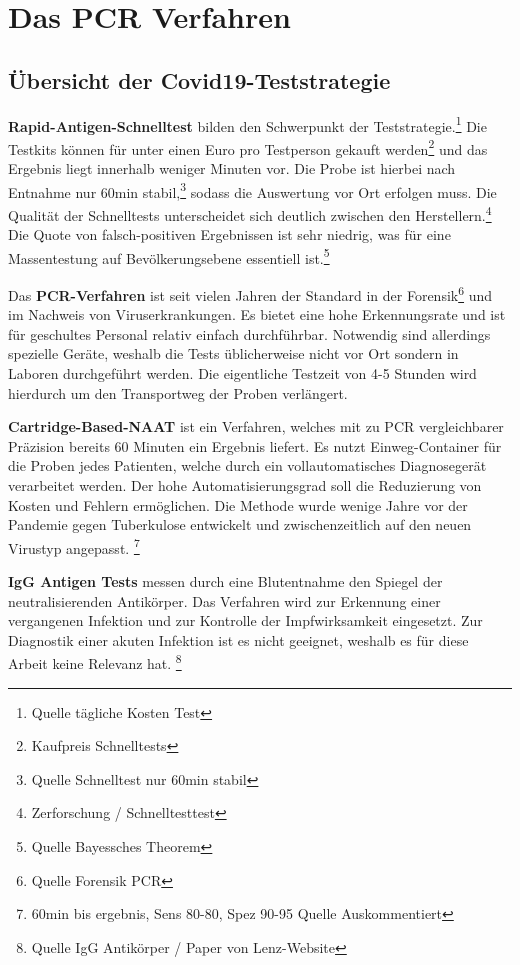 \chapter{Das PCR Verfahren}
\section{Übersicht der Covid19-Teststrategie}
\textbf{Rapid-Antigen-Schnelltest} bilden den Schwerpunkt der Teststrategie.\footnote{Quelle tägliche Kosten Test}
Die Testkits können für unter einen Euro pro Testperson gekauft werden\footnote{Kaufpreis Schnelltests}
und das Ergebnis liegt innerhalb weniger Minuten vor.
Die Probe ist hierbei nach Entnahme nur 60min stabil,\footnote{Quelle Schnelltest nur 60min stabil}
sodass die Auswertung vor Ort erfolgen muss.
Die Qualität der Schnelltests unterscheidet sich deutlich zwischen den Herstellern.\footnote{Zerforschung / Schnelltesttest}
Die Quote von falsch-positiven Ergebnissen ist sehr niedrig, was für eine Massentestung auf Bevölkerungsebene essentiell ist.\footnote{Quelle Bayessches Theorem}

Das \textbf{PCR-Verfahren} ist seit vielen Jahren der Standard in der Forensik\footnote{Quelle Forensik PCR}
und im Nachweis von Viruserkrankungen. Es bietet eine hohe Erkennungsrate und ist für geschultes Personal relativ einfach durchführbar. Notwendig sind allerdings spezielle Geräte, weshalb die Tests üblicherweise nicht vor Ort sondern in Laboren durchgeführt werden. Die eigentliche Testzeit von 4-5 Stunden wird hierdurch um den Transportweg der Proben verlängert.

\textbf{Cartridge-Based-NAAT} ist ein Verfahren, welches mit zu PCR vergleichbarer Präzision bereits 60 Minuten ein Ergebnis liefert. Es nutzt Einweg-Container für die Proben jedes Patienten, welche durch ein vollautomatisches Diagnosegerät verarbeitet werden. Der hohe Automatisierungsgrad soll die Reduzierung von Kosten und Fehlern ermöglichen. Die Methode wurde wenige Jahre vor der Pandemie gegen Tuberkulose entwickelt und zwischenzeitlich auf den neuen Virustyp angepasst.
\footnote{60min bis ergebnis, Sens 80-80, Spez 90-95 Quelle Auskommentiert} %

\textbf{IgG Antigen Tests} messen durch eine Blutentnahme den Spiegel der neutralisierenden Antikörper.
Das Verfahren wird zur Erkennung einer vergangenen Infektion und zur Kontrolle der Impfwirksamkeit eingesetzt.
Zur Diagnostik einer akuten Infektion ist es nicht geeignet, weshalb es für diese Arbeit keine Relevanz hat.
\footnote{Quelle IgG Antikörper / Paper von Lenz-Website}


